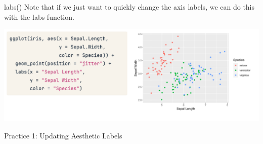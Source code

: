 \documentclass[
  ignorenonframetext,
]{beamer}
\begin{document}
\begin{frame}{labs()}
\label{labs}
Note that if we just want to quickly change the axis labels, we can do
this with the labs function.

\includegraphics{../images/im165.png}
\end{frame}

\begin{frame}{Practice 1: Updating Aesthetic Labels}
\label{practice-1-updating-aesthetic-labels}
\end{frame}
\end{document}
